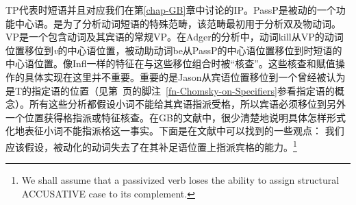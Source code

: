 TP代表时短语并且对应我们在第\ref{chap-GB}章中讨论的IP。PassP是被动的一个功能中心语。\vPc{}是为了分析动词短语的特殊范畴，该范畴最初用于分析双及物动词\citep{Larson88a}。VP是一个包含动词及其宾语的常规VP。在Adger的分析中，动词kill从VP的动词位置移位到\textit{v}的中心语位置，被动助动词be从PassP的中心语位置移位到时短语的中心语位置。像Infl一样的特征在与这些移位组合时被“核查”。这些核查和赋值操作的具体实现在这里并不重要。重要的是Jason从宾语位置移位到一个曾经被认为是T的指定语的位置（见第~\pageref{fn-Chomsky-on-Specifiers}页的脚注~\ref{fn-Chomsky-on-Specifiers}参看指定语的概念）。所有这些分析都假设小词不能给其宾语指派受格，所以宾语必须移位到另外一个位置获得格指派或特征核查。在GB的文献中，很少清楚地说明具体怎样形式化地表征小词不能指派格这一事实。下面是在文献中可以找到的一些观点：
\eal
\ex 我们应该假设，被动化的动词失去了在其补足语位置上指派宾格的能力。\footnote{%
We shall assume that a passivized verb loses the ability to assign structural ACCUSATIVE case to
its complement.}\citep[]{Haegeman94a-u}

